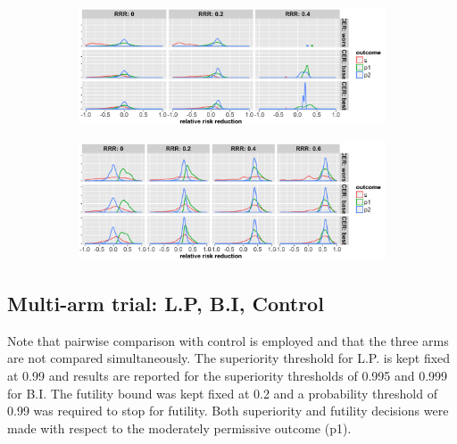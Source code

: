 \documentclass[]{article}
\begin{document}
\begin{figure}
\centering
  \caption{Distribution of relative risk reduction estimates after stopping early for (a) futility; (b) superiority.
  Results are presented for the three control event rates by rows, four relative risk reductions (by columns) and the
  three outcomes (legend).}
  \begin{subfigure}{0.8\textwidth}
    \centering
    \caption{}
    \includegraphics{../plots/stop_p1_new/RRRhat_fut_sim_05_stopp1_new.png}
  \end{subfigure}
  \bigbreak
  \begin{subfigure}{0.8\textwidth}
    \centering
    \caption{}
    \includegraphics{../plots/stop_p1_new/RRRhat_sup_sim_05_stopp1_new.png}
  \end{subfigure}
\end{figure}

\hypertarget{multi-arm-trial-l.p-b.i-control}{%
\subsection{Multi-arm trial: L.P, B.I,
Control}\label{multi-arm-trial-l.p-b.i-control}}

Note that pairwise comparison with control is employed and that the
three arms are not compared simultaneously. The superiority threshold
for L.P. is kept fixed at 0.99 and results are reported for the
superiority thresholds of 0.995 and 0.999 for B.I. The futility bound
was kept fixed at 0.2 and a probability threshold of 0.99 was required
to stop for futility. Both superiority and futility decisions were made
with respect to the moderately permissive outcome (p1).
\end{document}
